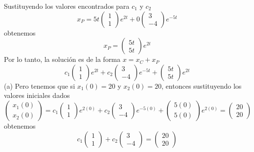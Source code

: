 Sustituyendo los valores encontrados para $c_1$ y $c_2$
$$x_P = 5t \begin{pmatrix}
     1\\
     1
     \end{pmatrix}e^{2t} + 0 \begin{pmatrix}
     3\\
     -4
     \end{pmatrix}e^{-5t}$$
obtenemos
$$x_P = \begin{pmatrix}
     5t\\
     5t
     \end{pmatrix}e^{2t}$$ 
Por lo tanto, la solución es de la forma $x = x_C + x_P$
$$c_1 \begin{pmatrix}
     1\\
     1
     \end{pmatrix}e^{2t} + c_2 \begin{pmatrix}
     3\\
     -4
     \end{pmatrix}e^{-5t} + \begin{pmatrix}
     5t\\
     5t
     \end{pmatrix}e^{2t}$$
(a) Pero tenemos que si $x_1(0) = 20$ y $x_2(0) = 20$, entonces sustituyendo los valores iniciales dados
$$\begin{pmatrix}
x_1(0)\\
x_2(0)
\end{pmatrix} = c_1 \begin{pmatrix}
1\\
1
\end{pmatrix}e^{2(0)} + c_2 \begin{pmatrix}
3\\
-4
\end{pmatrix}e^{-5(0)} + \begin{pmatrix}
5(0)\\
5(0)
\end{pmatrix}e^{2(0)} = \begin{pmatrix}
20\\
20
\end{pmatrix}$$
obtenemos
$$c_1 \begin{pmatrix}
1\\
1
\end{pmatrix} + c_2 \begin{pmatrix}
3\\
-4
\end{pmatrix} = \begin{pmatrix}
20\\
20
\end{pmatrix}$$
